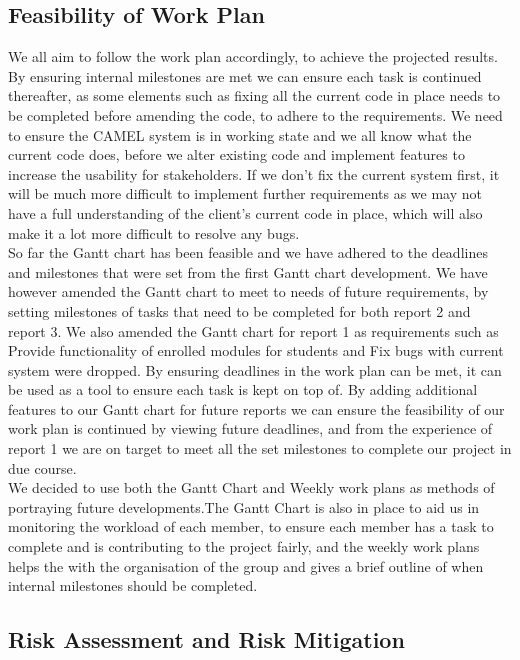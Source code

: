 \subsection*{Feasibility of Work Plan}

We all aim to follow the work plan accordingly, to achieve the projected results. By ensuring internal milestones are met we can ensure each task is continued thereafter, as some elements such as fixing all the current code in place needs to be completed before amending the code, to adhere to the requirements. We need to ensure the CAMEL system is in working state and we all know what the current code does, before we alter existing code and implement features to increase the usability for stakeholders. If we don’t fix the current system first, it will be much more difficult to implement further requirements as we may not have a full understanding of the client's current code in place, which will also make it a lot more difficult to resolve any bugs. \\

So far the Gantt chart has been feasible and we have adhered to the deadlines and milestones that were set from the first Gantt chart development. We have however amended the Gantt chart to meet to needs of future requirements, by setting milestones of tasks that need to be completed for both report 2 and report 3. We also amended the Gantt chart for report 1 as requirements such as Provide functionality of enrolled modules for students and Fix bugs with current system were dropped. By ensuring deadlines in the work plan can be met, it can be used as a tool to ensure each task is kept on top of. By adding additional features to our Gantt chart for future reports we can ensure the feasibility of our work plan is continued by viewing future deadlines, and from the experience of report 1 we are on target to meet all the set milestones to complete our project in due course. \\

We decided to use both the Gantt Chart and Weekly work plans as methods of portraying future developments.The Gantt Chart is also in place to aid us in monitoring the workload of each member, to ensure each member has a task to complete and is contributing to the project fairly, and the weekly work plans helps the with the organisation of the group and gives a brief outline of when internal milestones should be completed. \\

\subsection*{Risk Assessment and Risk Mitigation}

